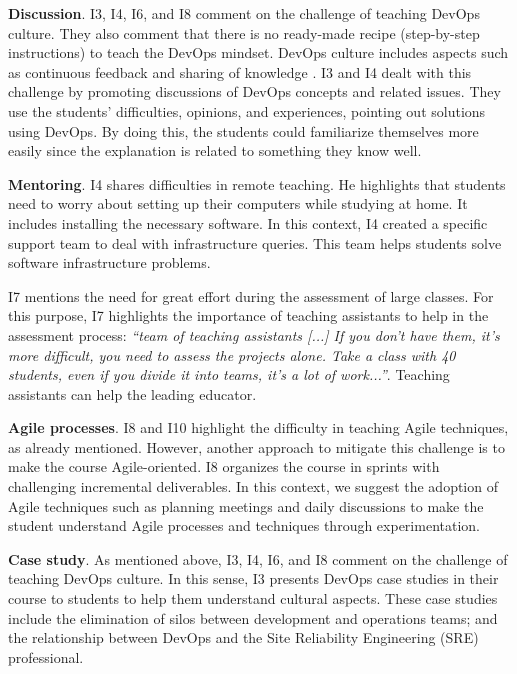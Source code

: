 \documentclass[10pt,conference]{IEEEtran}
\begin{document}
\textbf{Discussion}. I3, I4, I6, and I8 comment on the challenge of teaching DevOps culture. They also comment that there is no ready-made recipe (step-by-step instructions) to teach the DevOps mindset.  DevOps culture includes aspects such as continuous feedback and sharing of knowledge \cite{sanchez:2018}. I3 and I4 dealt with this challenge by promoting discussions of DevOps concepts and related issues. They use the students' difficulties, opinions, and experiences, pointing out solutions using DevOps. By doing this, the students could familiarize themselves more easily since the explanation is related to something they know well.


\textbf{Mentoring}. I4 shares difficulties in remote teaching. He highlights that students need to worry about setting up their computers while studying at home. It includes installing the necessary software. In this context, I4 created a specific support team to deal with infrastructure queries. This team helps students solve software infrastructure problems.

I7 mentions the need for great effort during the assessment of large classes. For this purpose, I7 highlights the importance of teaching assistants to help in the assessment process: \textit{``team of teaching assistants [...] If you don't have them, it's more difficult, you need to assess the projects alone. Take a class with 40 students, even if you divide it into teams, it's a lot of work...''}. Teaching assistants can help the leading educator.



\textbf{Agile processes}. I8 and I10 highlight the difficulty in teaching Agile techniques, as already mentioned. However, another approach to mitigate this challenge is to make the course Agile-oriented. I8 organizes the course in sprints with challenging incremental deliverables. In this context, we suggest the adoption of Agile techniques such as planning meetings and daily discussions \cite{diebold:2014} to make the student understand Agile processes and techniques through experimentation.

        
\textbf{Case study}. As mentioned above, I3, I4, I6, and I8 comment on the challenge of teaching DevOps culture. In this sense, I3 presents DevOps case studies in their course to students to help them understand cultural aspects. These case studies include the elimination of silos between development and operations teams; and the relationship between DevOps and the Site Reliability Engineering (SRE) professional.
\end{document}
